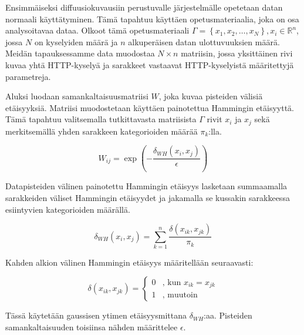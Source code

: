 Ensimmäiseksi diffuusiokuvausiin perustuvalle järjestelmälle opetetaan datan normaali käyttätyminen. Tämä tapahtuu käyttäen opetusmateriaalia, joka on osa analysoitavaa dataa. Olkoot tämä opetusmateriaali 
$\Gamma = \left\{ x_1, x_2, \dots , x_N \right\}, x_i \in \mathbb{R}^n$, jossa $N$ on kyselyiden määrä ja $n$ alkuperäisen datan ulottuvuuksien määrä. Meidän tapauksessamme data muodostaa $N \times n$ matriisin, jossa 
yksittäinen rivi kuvaa yhtä HTTP-kyselyä ja sarakkeet vastaavat HTTP-kyselyistä määritettyjä parametreja.

Aluksi luodaan samankaltaisuusmatriisi $W$, joka kuvaa pisteiden välisiä etäisyyksiä.
Matriisi muodostetaan käyttäen painotettua Hammingin etäisyyttä. Tämä tapahtuu valitsemalla tutkittavasta matriisista $\Gamma$ rivit $x_i$ ja $x_j$ sekä merkitsemällä yhden sarakkeen kategorioiden määrää $\pi_k$:lla.


\begin{equation*}
W_{ij} = \exp\left(-\frac{\delta_{WH}(x_i, x_j)}{\epsilon}\right)
\label{KERNEL}
\end{equation*}

\noindent Datapisteiden välinen painotettu Hammingin etäisyys lasketaan summaamalla sarakkeiden väliset Hammingin etäisyydet ja jakamalla se kussakin sarakkeessa esiintyvien kategorioiden määrällä.

\begin{equation*}
\delta_{WH}(x_i,x_j) = \sum_{k=1}^{n} \frac{\delta(x_{ik},x_{jk})}{\pi_k}
\label{W_HAMMING}
\end{equation*}

\noindent Kahden alkion välinen Hammingin etäisyys määritellään seuraavasti:

\begin{equation*}
\delta(x_{ik},x_{jk}) = 
\begin{cases}
0 & \text{, kun } x_{ik} = x_{jk} \\
1 & \text{, muutoin}
\end{cases}
\label{HAMMING}
\end{equation*}

\noindent Tässä käytetään gaussisen ytimen etäisyysmittana $\delta_{WH}$:aa. Pisteiden samankaltaisuuden toisiinsa nähden määrittelee $\epsilon$. 



